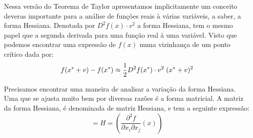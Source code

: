 \par Nessa versão do Teorema de Taylor apresentamos implicitamente um conceito deveras importante para a análise de funções reais à várias variáveis, a saber, a forma Hessiana. Denotada por $D^2f(x) \cdot v^2$ a forma Hessiana, tem o mesmo papel que a segunda derivada para uma função real à uma variável. Visto que podemos encontrar uma expressão de $f(x)$ numa vizinhança de um ponto crítico dada por:	
\begin{equation}
  f(x^*+v) - f(x^*) \approx \frac{1}{2} D^2f(x^*) \cdot v^2 \hspace{0.1cm}  (x^*+v)^2
\end{equation}

\par Precisamos encontrar uma maneira de analisar a variação da forma Hessiana. Uma que se ajusta muito bem por diversas razões é a forma matricial. A matriz da forma Hessiana, é denominada de matriz Hessiana, e tem a seguinte expressão:
\begin{equation}
  [D^2f(x)] = H = \left(\frac{\partial^2 f}{\partial x_i \partial x_j }(x)\right)
\end{equation}

